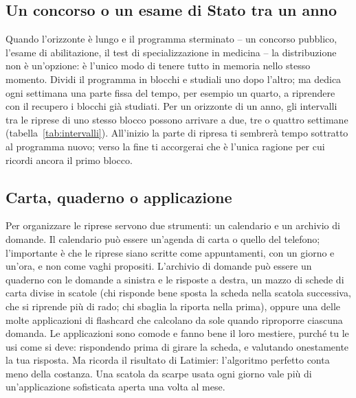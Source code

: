 \subsection*{Un concorso o un esame di Stato tra un anno}

Quando l'orizzonte è lungo e il programma sterminato -- un concorso
pubblico, l'esame di abilitazione, il test di specializzazione in
medicina -- la distribuzione non è un'opzione: è l'unico modo di
tenere tutto in memoria nello stesso momento. Dividi il programma in
blocchi e studiali uno dopo l'altro; ma dedica ogni settimana una parte
fissa del tempo, per esempio un quarto, a riprendere con il recupero i
blocchi già studiati. Per un orizzonte di un anno, gli intervalli tra
le riprese di uno stesso blocco possono arrivare a due, tre o quattro
settimane (tabella~\ref{tab:intervalli}). All'inizio la parte di
ripresa ti sembrerà tempo sottratto al programma nuovo; verso la fine
ti accorgerai che è l'unica ragione per cui ricordi ancora il primo
blocco.

\subsection*{Carta, quaderno o applicazione}

Per organizzare le riprese servono due strumenti: un calendario e un
archivio di domande. Il calendario può essere un'agenda di carta o
quello del telefono; l'importante è che le riprese siano scritte come
appuntamenti, con un giorno e un'ora, e non come vaghi propositi.
L'archivio di domande può essere un quaderno con le domande a sinistra e
le risposte a destra, un mazzo di schede di carta divise in scatole
(chi risponde bene sposta la scheda nella scatola successiva, che si
riprende più di rado; chi sbaglia la riporta nella prima), oppure una
delle molte applicazioni di flashcard che calcolano da sole quando
riproporre ciascuna domanda. Le applicazioni sono comode e fanno bene
il loro mestiere, purché tu le usi come si deve: rispondendo prima di
girare la scheda, e valutando onestamente la tua risposta. Ma ricorda
il risultato di Latimier: l'algoritmo perfetto conta meno della
costanza. Una scatola da scarpe usata ogni giorno vale più di
un'applicazione sofisticata aperta una volta al mese.

